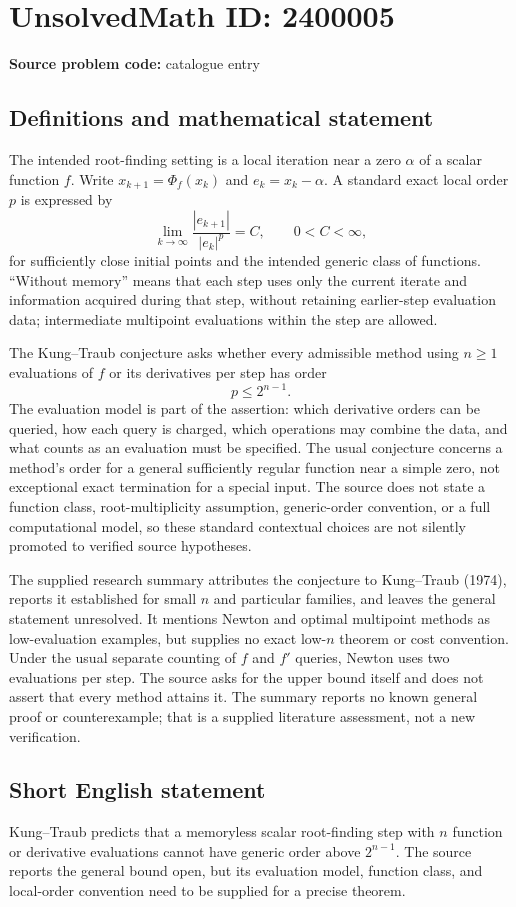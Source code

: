 \documentclass[11pt]{article}
\begin{document}
\section*{UnsolvedMath ID: 2400005}
\textbf{Source problem code:} catalogue entry
\subsection{Definitions and mathematical statement}
The intended root-finding setting is a local iteration near a zero $\alpha$ of a scalar function $f$. Write $x_{k+1}=\Phi_f(x_k)$ and $e_k=x_k-\alpha$. A standard exact local order $p$ is expressed by
\[
\lim_{k\to\infty}\frac{|e_{k+1}|}{|e_k|^p}=C,
\qquad 0<C<\infty,
\]
for sufficiently close initial points and the intended generic class of functions. ``Without memory'' means that each step uses only the current iterate and information acquired during that step, without retaining earlier-step evaluation data; intermediate multipoint evaluations within the step are allowed.

The Kung--Traub conjecture asks whether every admissible method using $n\geq1$ evaluations of $f$ or its derivatives per step has order
\[
p\leq2^{n-1}.
\]
The evaluation model is part of the assertion: which derivative orders can be queried, how each query is charged, which operations may combine the data, and what counts as an evaluation must be specified. The usual conjecture concerns a method's order for a general sufficiently regular function near a simple zero, not exceptional exact termination for a special input. The source does not state a function class, root-multiplicity assumption, generic-order convention, or a full computational model, so these standard contextual choices are not silently promoted to verified source hypotheses.

The supplied research summary attributes the conjecture to Kung--Traub (1974), reports it established for small $n$ and particular families, and leaves the general statement unresolved. It mentions Newton and optimal multipoint methods as low-evaluation examples, but supplies no exact low-$n$ theorem or cost convention. Under the usual separate counting of $f$ and $f'$ queries, Newton uses two evaluations per step. The source asks for the upper bound itself and does not assert that every method attains it. The summary reports no known general proof or counterexample; that is a supplied literature assessment, not a new verification.
\subsection{Short English statement}
Kung--Traub predicts that a memoryless scalar root-finding step with $n$ function or derivative evaluations cannot have generic order above $2^{n-1}$. The source reports the general bound open, but its evaluation model, function class, and local-order convention need to be supplied for a precise theorem.
\end{document}
